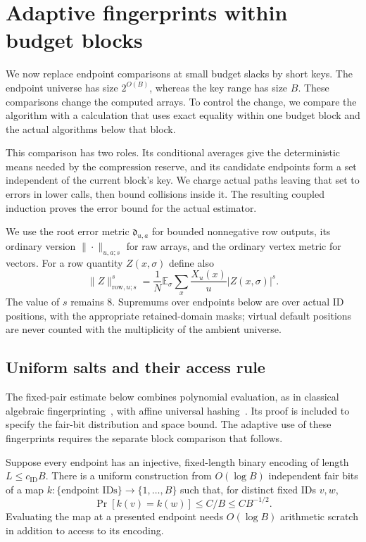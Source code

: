 \section{Adaptive fingerprints within budget blocks}
\label{sec:fp-blocks}

We now replace endpoint comparisons at small budget slacks by short keys.
The endpoint universe has size $2^{O(B)}$, whereas the key range has size
$B$.  These comparisons change the computed arrays.  To control the change,
we compare the algorithm with a calculation that uses exact equality
within one budget block and the actual algorithms below that block.

This comparison has two roles.  Its conditional averages give the
deterministic means needed by the compression reserve, and its candidate
endpoints form a set independent of the current block's key.  We charge
actual paths leaving that set to errors in lower calls, then bound
collisions inside it.  The resulting coupled induction proves the error
bound for the actual estimator.

We use the root error metric $\mathfrak d_{u,a}$ for bounded nonnegative row
outputs, its ordinary version $\|\cdot\|_{u,a;s}$ for raw arrays, and the
ordinary vertex metric for vectors.  For a row quantity $Z(x,\sigma)$ define
also
\begin{equation}
 \|Z\|_{\mathrm{row},u;s}^s
 =\frac1N\mathbb E_\sigma\sum_x\frac{X_u(x)}u|Z(x,\sigma)|^s.
 \label{eq:fp-row-measure}
\end{equation}
The value of $s$ remains $8$.  Supremums over endpoints below are over actual
ID positions, with the appropriate retained-domain masks; virtual default
positions are never counted with the multiplicity of the ambient universe.

\subsection{Uniform salts and their access rule}

The fixed-pair estimate below combines polynomial evaluation, as in
classical algebraic fingerprinting~\cite{Schwartz1980}, with affine
universal hashing~\cite{CarterWegman1979}. Its proof is included to
specify the fair-bit distribution and space bound. The adaptive use of
these fingerprints requires the separate block comparison that follows.

\begin{lemma}\label{lem:fp-hash}
Suppose every endpoint has an injective, fixed-length binary encoding of
length $L\le c_{\mathrm{ID}}B$.  There is a uniform construction from
$O(\log B)$ independent fair bits of a map
$k:\{\text{endpoint IDs}\}\longrightarrow\{1,\ldots,B\}$ such that, for
distinct fixed IDs $v,w$,
\begin{equation}
 \Pr[k(v)=k(w)]\le C/B\le C B^{-1/2}.
 \label{eq:fp-pair-collision}
\end{equation}
Evaluating the map at a presented endpoint needs $O(\log B)$ arithmetic
scratch in addition to access to its encoding.
\end{lemma}

